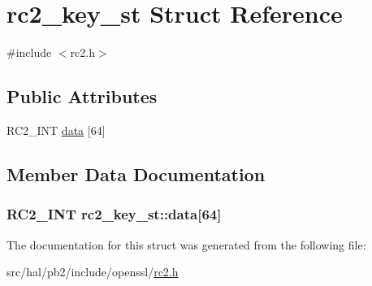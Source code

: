 \hypertarget{structrc2__key__st}{}\section{rc2\+\_\+key\+\_\+st Struct Reference}
\label{structrc2__key__st}


{\ttfamily \#include $<$rc2.\+h$>$}

\subsection*{Public Attributes}
\begin{DoxyCompactItemize}
\item 
R\+C2\+\_\+\+I\+NT \hyperlink{structrc2__key__st_a4626a56b45c5ae4d5971705c55eea281}{data} \mbox{[}64\mbox{]}
\end{DoxyCompactItemize}


\subsection{Member Data Documentation}
\subsubsection[{\texorpdfstring{data}{data}}]{\setlength{\rightskip}{0pt plus 5cm}R\+C2\+\_\+\+I\+NT rc2\+\_\+key\+\_\+st\+::data\mbox{[}64\mbox{]}}\hypertarget{structrc2__key__st_a4626a56b45c5ae4d5971705c55eea281}{}\label{structrc2__key__st_a4626a56b45c5ae4d5971705c55eea281}


The documentation for this struct was generated from the following file\+:\begin{DoxyCompactItemize}
\item 
src/hal/pb2/include/openssl/\hyperlink{rc2_8h}{rc2.\+h}\end{DoxyCompactItemize}
